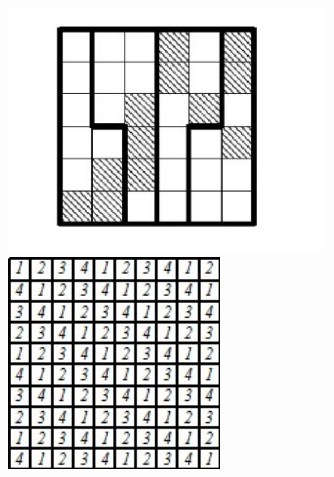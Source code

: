 \documentclass[12 pt, a4paper]{article}%
\begin{document}
	\begin{figure}[H]
		\begin{minipage}[h]{0.5\linewidth}
			\centering
			\includegraphics[width=0.75\textwidth]{6_ans_1.jpg}
		\end{minipage}
		\hfill
		\begin{minipage}[h]{0.5\linewidth}
			\centering
			\includegraphics[width=0.5\textwidth]{10_ans.jpg}
		\end{minipage}
	\end{figure}
\end{document}
